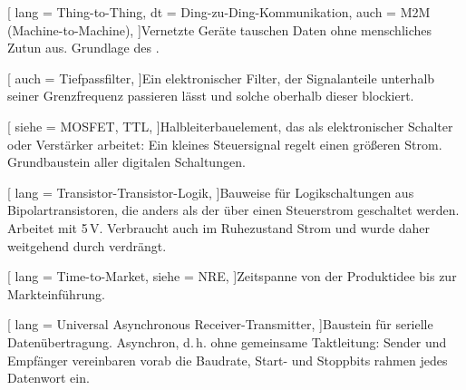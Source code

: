 [
  lang  = Thing-to-Thing,
  dt    = Ding-zu-Ding-Kommunikation,
  auch  = M2M (Machine-to-Machine),
]{Vernetzte Geräte tauschen Daten ohne menschliches Zutun aus. Grundlage des .}

[
  auch  = Tiefpassfilter,
]{Ein elektronischer Filter, der Signalanteile unterhalb seiner Grenzfrequenz passieren lässt und solche oberhalb dieser blockiert.}

[
  siehe = {MOSFET, TTL},
]{Halbleiterbauelement, das als elektronischer Schalter oder Verstärker arbeitet: Ein kleines Steuersignal regelt einen größeren Strom. Grundbaustein aller digitalen Schaltungen.}

[
  lang  = Transistor-Transistor-Logik,
]{Bauweise für Logikschaltungen aus Bipolartransistoren, die anders als der  über einen Steuerstrom geschaltet werden. Arbeitet mit 5\,V. Verbraucht auch im Ruhezustand Strom und wurde daher weitgehend durch  verdrängt.}

[
  lang  = Time-to-Market,
  siehe = NRE,
]{Zeitspanne von der Produktidee bis zur Markteinführung.}

[
  lang  = Universal Asynchronous Receiver-Transmitter,
]{Baustein für serielle Datenübertragung. Asynchron, d.\,h. ohne gemeinsame Taktleitung: Sender und Empfänger vereinbaren vorab die Baudrate, Start- und Stoppbits rahmen jedes Datenwort ein.}
